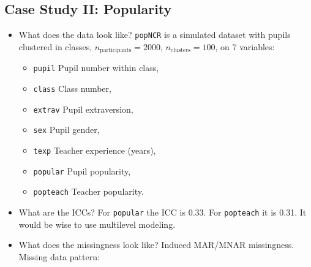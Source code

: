 \documentclass[
]{jss}
\providecommand{\tightlist}{%
  \setlength{\itemsep}{0pt}\setlength{\parskip}{0pt}}
\begin{document}
\hypertarget{case-study-ii-popularity}{%
\subsection{Case Study II: Popularity}\label{case-study-ii-popularity}}

\begin{itemize}
\item
  What does the data look like? \texttt{popNCR} is a simulated dataset
  with pupils clustered in classes, \(n_{\text{participants}} = 2000\),
  \(n_{\text{clusters}} = 100\), on 7 variables:

  \begin{itemize}
  \tightlist
  \item
    \texttt{pupil} Pupil number within class,
  \item
    \texttt{class} Class number,
  \item
    \texttt{extrav} Pupil extraversion,
  \item
    \texttt{sex} Pupil gender,
  \item
    \texttt{texp} Teacher experience (years),
  \item
    \texttt{popular} Pupil popularity,
  \item
    \texttt{popteach} Teacher popularity.
  \end{itemize}
\item
  What are the ICCs? For \texttt{popular} the ICC is 0.33. For
  \texttt{popteach} it is 0.31. It would be wise to use multilevel
  modeling.
\item
  What does the missingness look like? Induced MAR/MNAR missingness.
  Missing data pattern:
\end{itemize}
\end{document}
